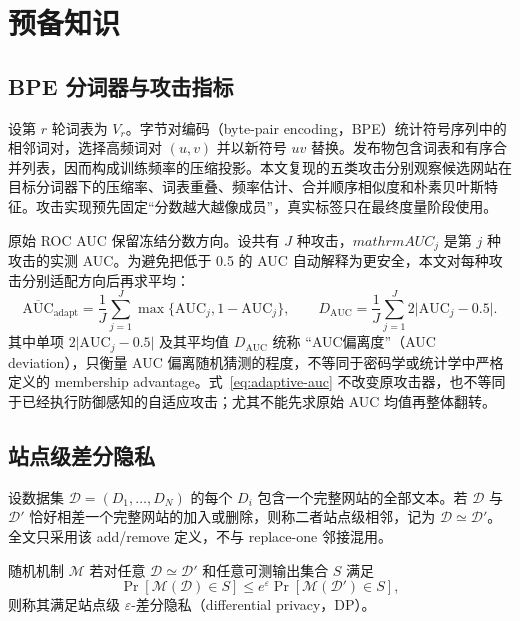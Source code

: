 \section{预备知识}

\subsection{BPE 分词器与攻击指标}

设第 $r$ 轮词表为 $V_r$。字节对编码（byte-pair encoding，BPE）统计符号序列中的相邻词对，选择高频词对 $(u,v)$ 并以新符号 $uv$ 替换。发布物包含词表和有序合并列表，因而构成训练频率的压缩投影。本文复现的五类攻击分别观察候选网站在目标分词器下的压缩率、词表重叠、频率估计、合并顺序相似度和朴素贝叶斯特征。攻击实现预先固定“分数越大越像成员”，真实标签只在最终度量阶段使用。

原始 ROC AUC 保留冻结分数方向。设共有 $J$ 种攻击，$mathrm{AUC}_j$ 是第 $j$ 种攻击的实测 AUC。为避免把低于 0.5 的 AUC 自动解释为更安全，本文对每种攻击分别适配方向后再求平均：
\begin{equation}
 \overline{\mathrm{AUC}}_{\mathrm{adapt}}
 =\frac{1}{J}\sum_{j=1}^{J}\max\{\mathrm{AUC}_j,1-\mathrm{AUC}_j\},\qquad
 D_{\mathrm{AUC}}=\frac{1}{J}\sum_{j=1}^{J}2\lvert \mathrm{AUC}_j-0.5\rvert .
 \label{eq:adaptive-auc}
\end{equation}
其中单项 $2\lvert\mathrm{AUC}_j-0.5\rvert$ 及其平均值 $D_{\mathrm{AUC}}$ 统称 ``AUC偏离度''（AUC deviation），只衡量 AUC 偏离随机猜测的程度，不等同于密码学或统计学中严格定义的 membership advantage。式~\eqref{eq:adaptive-auc} 不改变原攻击器，也不等同于已经执行防御感知的自适应攻击；尤其不能先求原始 AUC 均值再整体翻转。

\subsection{站点级差分隐私}

\begin{definition}
设数据集 $\mathcal D=(D_1,\ldots,D_N)$ 的每个 $D_i$ 包含一个完整网站的全部文本。若 $\mathcal D$ 与 $\mathcal D'$ 恰好相差一个完整网站的加入或删除，则称二者站点级相邻，记为 $\mathcal D\simeq\mathcal D'$。全文只采用该 add/remove 定义，不与 replace-one 邻接混用。
\end{definition}

\begin{definition}[站点级纯差分隐私]
随机机制 $\mathcal M$ 若对任意 $\mathcal D\simeq\mathcal D'$ 和任意可测输出集合 $S$ 满足
\begin{equation}
 \Pr[\mathcal M(\mathcal D)\in S]
 \leq e^{\varepsilon}\Pr[\mathcal M(\mathcal D')\in S],
 \label{eq:pure-dp}
\end{equation}
则称其满足站点级 $\varepsilon$-差分隐私（differential privacy，DP）。
\end{definition}

